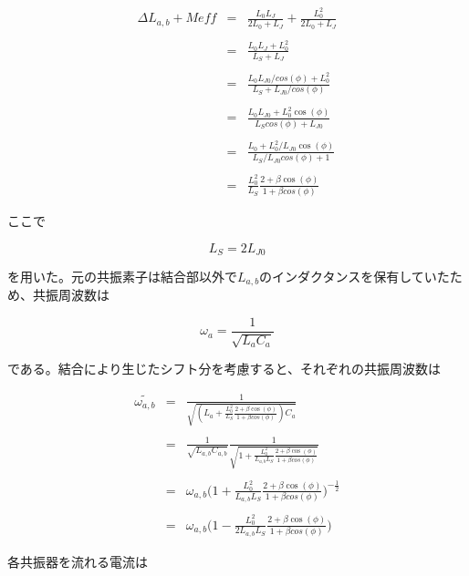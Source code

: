 \begin{eqnarray}
    \Delta L_{a,b} + M{eff} & = &  \frac{L_0L_J}{2L_0+L_J} + \frac{L_0^2}{2L_0+L_J}\\ \\
    & = & \frac{L_0 L_J + L_0^2}{L_S + L_J}\\ \\
    & = & \frac{L_0 L_{J0}/cos(\phi) + L_0^2}{L_S + L_{J0}/cos(\phi)}\\ \\
    & = & \frac{L_0 L_{J0} + L_0^2 \cos(\phi)}{L_S cos(\phi) + L_{J0}}\\ \\
    & = & \frac{L_0 + L_0^2/L_{J0} \cos(\phi)}{L_S/L_{J0} cos(\phi) + 1}\\ \\
    & = & \frac{L_0^2}{L_S}\frac{2 + \beta \cos(\phi)}{1+\beta cos(\phi)}
\end{eqnarray}

ここで

\begin{equation}
    L_S = 2L_{J0}
\end{equation}

を用いた。元の共振素子は結合部以外で$L_{a,b}$のインダクタンスを保有していたため、共振周波数は

\begin{equation}
    \omega_a = \frac{1}{\sqrt{L_aC_a}}
\end{equation}

である。結合により生じたシフト分を考慮すると、それぞれの共振周波数は

\begin{eqnarray}
    \tilde{\omega_{a,b}} &=&  \frac{1}{\sqrt{(L_a+\frac{L_0^2}{L_S}\frac{2 + \beta \cos(\phi)}{1+\beta cos(\phi)})C_a}}\\ \\
    & = &  \frac{1}{\sqrt{L_{a,b}C_{a,b}}} \frac{1}{\sqrt{1+\frac{L_0^2}{L_{a,b}L_S}\frac{2 + \beta \cos(\phi)}{1+\beta cos(\phi)}}}\\ \\
    & = &  \omega_{a,b} \biggl(1+\frac{L_0^2}{L_{a,b}L_S}\frac{2 + \beta \cos(\phi)}{1+\beta cos(\phi)}\biggr)^{-\frac{1}{2}}\\ \\
    & = &  \omega_{a,b} \biggl(1-\frac{L_0^2}{2L_{a,b}L_S}\frac{2 + \beta \cos(\phi)}{1+\beta cos(\phi)}\biggr)
\end{eqnarray}

各共振器を流れる電流は

